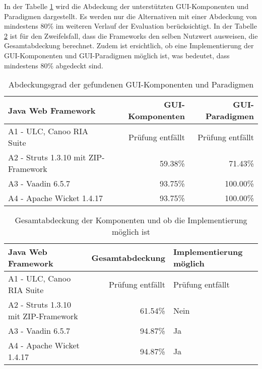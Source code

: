 In der Tabelle \ref{tab:unterstuetztungDerKomponenten} wird die Abdeckung der
unterstützten GUI-Komponenten und Paradigmen dargestellt. Es werden nur die
Alternativen mit einer Abdeckung von mindestens 80\% im weiteren
Verlauf der Evaluation berücksichtigt. In der Tabelle
\ref{tab:gesamtabdeckungUndObImplementierungMoeglichIst} ist für den
Zweifelsfall, dass die Frameworks den selben Nutzwert ausweisen, die
Gesamtabdeckung berechnet. Zudem ist ersichtlich, ob eine Implementierung der
GUI-Komponenten und GUI-Paradigmen möglich ist, was bedeutet, dass mindestens
80\% abgedeckt sind.

\begin{table}[!h]
  \sffamily 
  \begin{center}
    \begin{tabular}{lrr}
      \toprule
      \textbf{Java Web Framework} & \textbf{GUI-Komponenten} &
      \textbf{GUI-Paradigmen} \\
      \midrule
      A1 - ULC, Canoo RIA Suite & Prüfung entfällt & Prüfung entfällt\\
      A2 - Struts 1.3.10 mit ZIP-Framework & 59.38\% & 71.43\%\\
      A3 - Vaadin 6.5.7 & 93.75\% & 100.00\%\\
      A4 - Apache Wicket 1.4.17 & 93.75\% & 100.00\%\\
      \bottomrule
    \end{tabular}
    \caption{Abdeckungsgrad der gefundenen GUI-Komponenten und Paradigmen}
    \label{tab:unterstuetztungDerKomponenten}
  \end{center}
\end{table}

\begin{table}[!h]
  \sffamily 
  \begin{center}
    \begin{tabular}{lrp{3cm}}
      \toprule
      \textbf{Java Web Framework} & \textbf{Gesamtabdeckung} &
      \textbf{Implementierung möglich}\\
      \midrule
      A1 - ULC, Canoo RIA Suite & Prüfung entfällt & Prüfung entfällt\\
      A2 - Struts 1.3.10 mit ZIP-Framework & 61.54\% & Nein\\
      A3 - Vaadin 6.5.7 & 94.87\% & Ja\\
      A4 - Apache Wicket 1.4.17 & 94.87\% & Ja\\
      \bottomrule
    \end{tabular}
    \caption{Gesamtabdeckung der Komponenten und ob die Implementierung möglich
    ist}
    \label{tab:gesamtabdeckungUndObImplementierungMoeglichIst}
  \end{center}
\end{table}